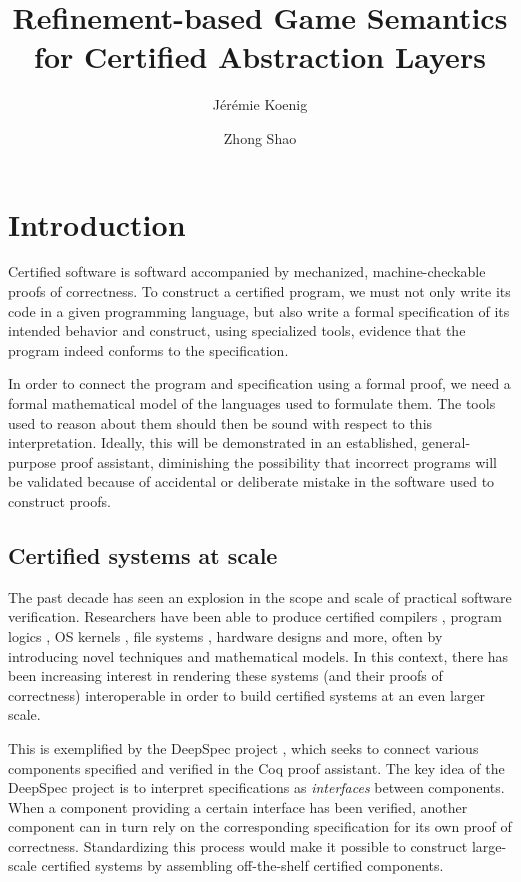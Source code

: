 \documentclass[format=sigplan,authordraft]{acmart}
\title{Refinement-based Game Semantics for Certified Abstraction Layers} %
\author{J\'er\'emie Koenig}
\affiliation{Yale University}
\author{Zhong Shao}
\affiliation{Yale University}
\begin{document}
\maketitle

\section{Introduction} %


Certified software
is softward accompanied by
mechanized, machine-checkable proofs of correctness.
To construct a certified program,
we must not only write its code in a given programming language,
but also write a formal specification of its intended behavior
and construct, using specialized tools,
evidence that the program
indeed conforms to the specification.

In order to connect the program and specification
using a formal proof,
we need a formal mathematical model of
the languages used to formulate them.
The tools used to reason about them
should then be sound with respect to this interpretation.
Ideally,
this will be demonstrated in an established,
general-purpose proof assistant,
diminishing the possibility that
incorrect programs will be validated because of
accidental or deliberate mistake
in the software used to construct proofs.


\subsection{Certified systems at scale} %

The past decade has seen an explosion
in the scope and scale of practical software verification.
Researchers have been able to produce certified
compilers \cite{compcert},
program logics \cite{vst},
OS kernels \cite{sel4,popl15},
file systems \cite{fscq},
hardware designs \cite{kami} and more,
often by introducing novel techniques
and mathematical models.
In this context,
there has been increasing interest in
rendering these systems (and their proofs of correctness)
interoperable
in order to build certified systems
at an even larger scale.

This is exemplified by the DeepSpec project \cite{deepspec},
which seeks to connect various components
specified and verified in the Coq proof assistant.
The key idea of the DeepSpec project
is to interpret specifications as \emph{interfaces}
between components.
When a component providing a certain interface
has been verified,
another component can in turn
rely on the corresponding specification
for its own proof of correctness.
Standardizing this process would make it possible
to construct large-scale certified systems
by assembling off-the-shelf certified components.
\end{document}
